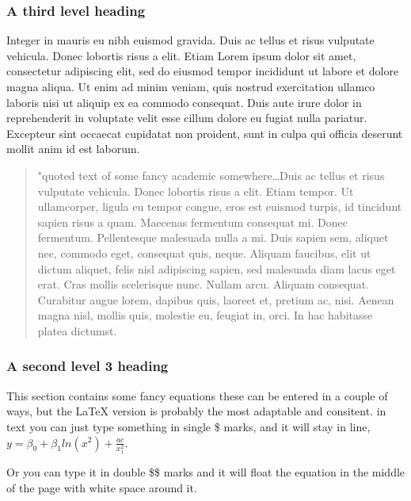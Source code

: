 \documentclass[10pt,twoside]{article}
\begin{document}
\hypertarget{sec:part2-sec2-subsec1}{%
\subsubsection{A third level heading}\label{sec:part2-sec2-subsec1}}

Integer in mauris eu nibh euismod gravida. Duis ac tellus et risus
vulputate vehicula. Donec lobortis risus a elit. Etiam Lorem ipsum dolor
sit amet, consectetur adipiscing elit, sed do eiusmod tempor incididunt
ut labore et dolore magna aliqua. Ut enim ad minim veniam, quis nostrud
exercitation ullamco laboris nisi ut aliquip ex ea commodo consequat.
Duis aute irure dolor in reprehenderit in voluptate velit esse cillum
dolore eu fugiat nulla pariatur. Excepteur sint occaecat cupidatat non
proident, sunt in culpa qui officia deserunt mollit anim id est laborum.

\begin{quote}
"quoted text of some fancy academic somewhere\ldots{}Duis ac tellus et
risus vulputate vehicula. Donec lobortis risus a elit. Etiam tempor. Ut
ullamcorper, ligula eu tempor congue, eros est euismod turpis, id
tincidunt sapien risus a quam. Maecenas fermentum consequat mi. Donec
fermentum. Pellentesque malesuada nulla a mi. Duis sapien sem, aliquet
nec, commodo eget, consequat quis, neque. Aliquam faucibus, elit ut
dictum aliquet, felis nisl adipiscing sapien, sed malesuada diam lacus
eget erat. Cras mollis scelerisque nunc. Nullam arcu. Aliquam consequat.
Curabitur augue lorem, dapibus quis, laoreet et, pretium ac, nisi.
Aenean magna nisl, mollis quis, molestie eu, feugiat in, orci. In hac
habitasse platea dictumst.
\end{quote}

\hypertarget{sec:part2-sec2-subsec2}{%
\subsubsection{A second level 3 heading}\label{sec:part2-sec2-subsec2}}

This section contains some fancy equations these can be entered in a
couple of ways, but the LaTeX version is probably the most adaptable and
consitent. in text you can just type something in single \$ marks, and
it will stay in line,
\(y = \beta_0 + \beta _1 ln(x^2) + \frac{ac}{x^2_1}\).

Or you can type it in double \$\$ marks and it will float the equation
in the middle of the page with white space around it.
\end{document}
